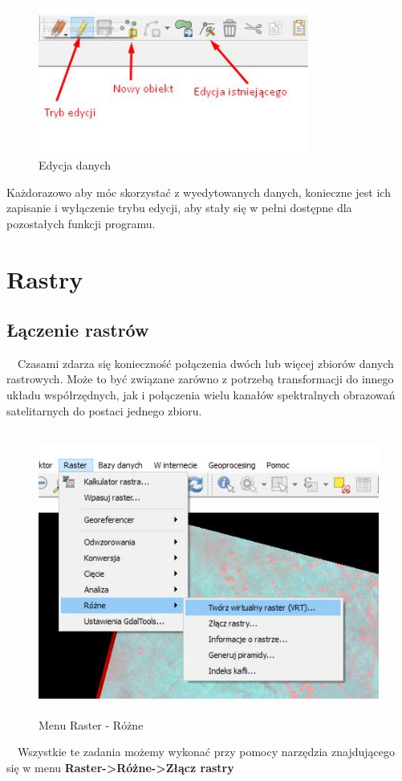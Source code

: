 \documentclass[12pt,a4paper]{book}
\begin{document}
\begin{center}
\begin{figure}
\includegraphics[width=8.901cm,height=4.851cm]{003-edycja.jpg}
\caption{Edycja danych}
\end{figure}
\end{center}
Każdorazowo aby móc skorzystać z wyedytowanych danych, konieczne jest ich zapisanie i wyłączenie trybu edycji, aby stały się w pełni dostępne dla pozostałych funkcji programu.


\chapter{Rastry}
\section{Łączenie rastrów}
\ \ Czasami zdarza się konieczność połączenia dwóch lub więcej zbiorów danych rastrowych. Może to być związane zarówno z potrzebą transformacji do innego układu współrzędnych, jak i połączenia wielu kanałów spektralnych obrazowań satelitarnych do postaci jednego zbioru.



\begin{center}
\begin{figure}
\includegraphics[width=12.513cm,height=9.338cm]{004-raster-rozne.jpg}
\caption{Menu Raster - Różne}
\end{figure}
\end{center}
\ \ Wszystkie te zadania możemy wykonać przy pomocy narzędzia znajdującego się w menu \textbf{Raster-{\textgreater}Różne-{\textgreater}Złącz rastry}
\end{document}
